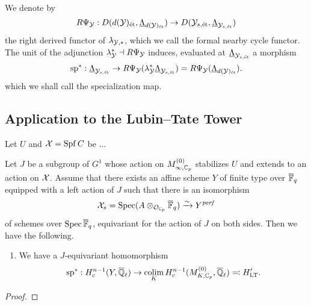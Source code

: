 \documentclass[../main.tex]{subfiles}
\begin{document}
\begin{defi}\label{def:FormalNearbyCycleFunctor}
  We denote by
  \begin{equation*}
    R \Psi_{\mathcal{Y}}: D(d(\mathcal{Y})_{\textnormal{\'et}}, {\underline \Lambda_{d(\mathcal{Y})_{\textnormal{\'et}}}}) \to
    D(\mathcal{Y}_{s, \textnormal{\'et}},{\underline \Lambda_{\mathcal{Y}_{s, \textnormal{\'et}}}})
  \end{equation*}
  the right derived functor of $\lambda_{\mathcal{Y},*}$, which we call the formal nearby
  cycle functor. The unit of the adjunction $\lambda_{\mathcal{Y}}^* \dashv 
  R \Psi_{\mathcal{Y}}$ induces, evaluated at $\underline \Lambda_{\mathcal{Y}_{s, \textnormal{\'et}}}$ a morphism
  \begin{equation*}
    \mathrm{sp}^* : \underline \Lambda_{\mathcal{Y}_{s, \textnormal{\'et}}} \to 
    R \Psi_{\mathcal{Y}}( \lambda_{\mathcal{Y}}^* \underline \Lambda_{\mathcal{Y}_{s, \textnormal{\'et}}}) = 
    R \Psi_{\mathcal{Y}}(\underline \Lambda_{d(\mathcal{Y})_{\textnormal{\'et}}}).
  \end{equation*}
  which we shall call the specialization map.
\end{defi}


\subsection{Application to the Lubin--Tate Tower} %
\label{sub:Application to the Lubin--Tate Tower}
Let $U$ and $\mathcal{X} = \operatorname{Spf} C$ be ...

\begin{thm}\label{thm:MiedaAppliedToLTT}
  Let $J$ be a subgroup of $G^1$ whose action on $M_{\infty, {\mathbb{C}_p}}^{(0)}$ 
  stabilizes $U$ and extends to an action on $\mathcal{X}$. Assume that there exists an
  affine scheme $Y$ of finite type over ${\overline {\mathbb{F}}_q}$ equipped with a left action of 
  $J$ such that there is an isomorphism
  \begin{equation*}
    \mathcal{X}_s = \operatorname{Spec}(A \otimes_{\mathcal{O}_{\mathbb{C}_p}} {\overline {\mathbb{F}}_q}) \xrightarrow{\sim} Y^{\mathit{perf}}
  \end{equation*}
  of schemes over $\operatorname{Spec} {\overline {\mathbb{F}}_q}$, equivariant for the action of $J$ on both sides.
  Then we have the following.
  \begin{enumerate}
    \item We have a $J$-equivariant homomorphism
      \begin{equation*}
        \mathrm{sp}^*: H_c^{n-1}(Y, \overline {\mathbb{Q}}_\ell) \to \operatorname*{colim}_K H_c^{n-1}
        (M_{K, {\mathbb{C}_p}}^{(0)}, \overline {\mathbb{Q}}_\ell) \eqcolon H_{\mathrm{LT}}'.
      \end{equation*}
  \end{enumerate}
\begin{proof}
\end{proof}
\end{thm}


\end{document}
